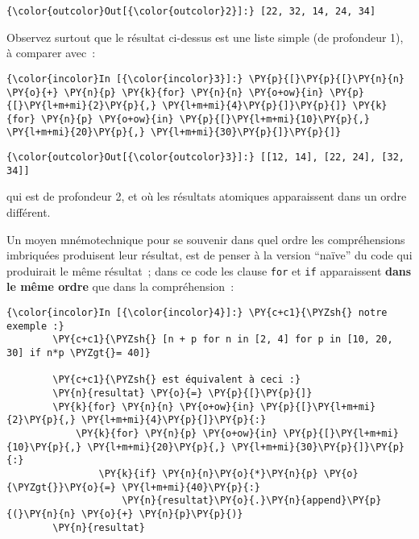 \begin{Verbatim}[commandchars=\\\{\}]
{\color{outcolor}Out[{\color{outcolor}2}]:} [22, 32, 14, 24, 34]
\end{Verbatim}
            
    Observez surtout que le résultat ci-dessus est une liste simple (de
profondeur 1), à comparer avec~:

    \begin{Verbatim}[commandchars=\\\{\}]
{\color{incolor}In [{\color{incolor}3}]:} \PY{p}{[}\PY{p}{[}\PY{n}{n} \PY{o}{+} \PY{n}{p} \PY{k}{for} \PY{n}{n} \PY{o+ow}{in} \PY{p}{[}\PY{l+m+mi}{2}\PY{p}{,} \PY{l+m+mi}{4}\PY{p}{]}\PY{p}{]} \PY{k}{for} \PY{n}{p} \PY{o+ow}{in} \PY{p}{[}\PY{l+m+mi}{10}\PY{p}{,} \PY{l+m+mi}{20}\PY{p}{,} \PY{l+m+mi}{30}\PY{p}{]}\PY{p}{]}
\end{Verbatim}


\begin{Verbatim}[commandchars=\\\{\}]
{\color{outcolor}Out[{\color{outcolor}3}]:} [[12, 14], [22, 24], [32, 34]]
\end{Verbatim}
            
    qui est de profondeur 2, et où les résultats atomiques apparaissent dans
un ordre différent.

    Un moyen mnémotechnique pour se souvenir dans quel ordre les
compréhensions imbriquées produisent leur résultat, est de penser à la
version ``naïve'' du code qui produirait le même résultat~; dans ce code
les clause \texttt{for} et \texttt{if} apparaissent \textbf{dans le même
ordre} que dans la compréhension~:

    \begin{Verbatim}[commandchars=\\\{\}]
{\color{incolor}In [{\color{incolor}4}]:} \PY{c+c1}{\PYZsh{} notre exemple :}
        \PY{c+c1}{\PYZsh{} [n + p for n in [2, 4] for p in [10, 20, 30] if n*p \PYZgt{}= 40]}
        
        \PY{c+c1}{\PYZsh{} est équivalent à ceci :}
        \PY{n}{resultat} \PY{o}{=} \PY{p}{[}\PY{p}{]}
        \PY{k}{for} \PY{n}{n} \PY{o+ow}{in} \PY{p}{[}\PY{l+m+mi}{2}\PY{p}{,} \PY{l+m+mi}{4}\PY{p}{]}\PY{p}{:}
            \PY{k}{for} \PY{n}{p} \PY{o+ow}{in} \PY{p}{[}\PY{l+m+mi}{10}\PY{p}{,} \PY{l+m+mi}{20}\PY{p}{,} \PY{l+m+mi}{30}\PY{p}{]}\PY{p}{:}
                \PY{k}{if} \PY{n}{n}\PY{o}{*}\PY{n}{p} \PY{o}{\PYZgt{}}\PY{o}{=} \PY{l+m+mi}{40}\PY{p}{:}
                    \PY{n}{resultat}\PY{o}{.}\PY{n}{append}\PY{p}{(}\PY{n}{n} \PY{o}{+} \PY{n}{p}\PY{p}{)}
        \PY{n}{resultat}
\end{Verbatim}


